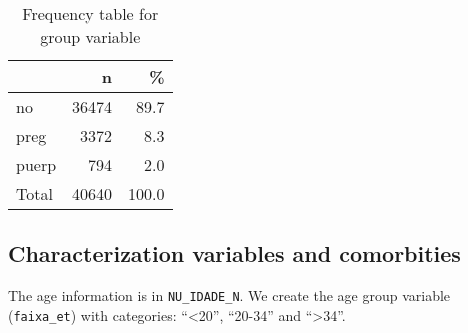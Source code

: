 \documentclass[
]{article}
\newenvironment{Shaded}{\begin{snugshade}}{\end{snugshade}}
\newcommand{\CommentTok}[1]{\textcolor[rgb]{0.56,0.35,0.01}{\textit{#1}}}
\newcommand{\DataTypeTok}[1]{\textcolor[rgb]{0.13,0.29,0.53}{#1}}
\newcommand{\DecValTok}[1]{\textcolor[rgb]{0.00,0.00,0.81}{#1}}
\newcommand{\KeywordTok}[1]{\textcolor[rgb]{0.13,0.29,0.53}{\textbf{#1}}}
\newcommand{\NormalTok}[1]{#1}
\newcommand{\OperatorTok}[1]{\textcolor[rgb]{0.81,0.36,0.00}{\textbf{#1}}}
\newcommand{\StringTok}[1]{\textcolor[rgb]{0.31,0.60,0.02}{#1}}
\begin{document}
\begin{table}[!h]

\caption{\label{tab:unnamed-chunk-21}Frequency table for group variable}
\centering
\begin{tabular}[t]{l|r|r}
\hline
  & n & \%\\
\hline
no & 36474 & 89.7\\
\hline
preg & 3372 & 8.3\\
\hline
puerp & 794 & 2.0\\
\hline
Total & 40640 & 100.0\\
\hline
\end{tabular}
\end{table}

\hypertarget{characterization-variables-and-comorbities}{%
\subsection{Characterization variables and
comorbities}\label{characterization-variables-and-comorbities}}

The age information is in \texttt{NU\_IDADE\_N}. We create the age group
variable (\texttt{faixa\_et}) with categories: ``\textless20'',
``20-34'' and ``\textgreater34''.

\begin{Shaded}
\end{Shaded}
\end{document}
